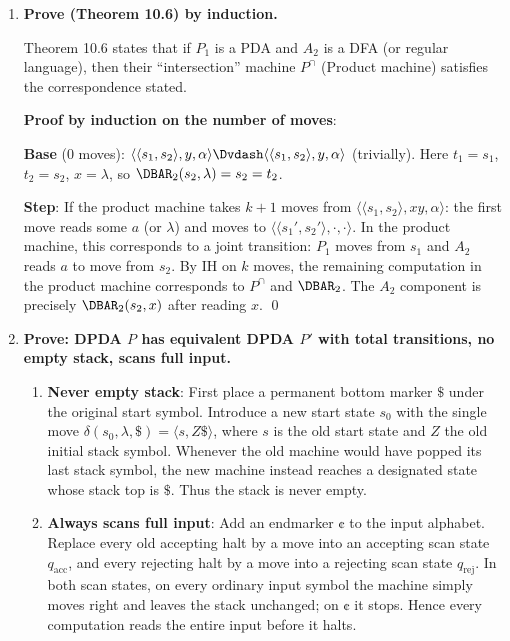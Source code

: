 \begin{enumerate}[{10.}1. ]
\textbf{Case 3}: $vx$ spans the $\pmb{b}$/$\pmb{c}$ boundary. Let $|vx|_{\pmb{b}}=j \geq 1$ and $|vx|_{\pmb{c}}=r \geq 0$. Choose $i-1 = p!/j$. The pumped string has $n = p!+p$ and $k = p!+p$ (the $\pmb{a}$-block is untouched), so $k = n$, violating $k\neq n$. Contradiction. \qed

\item \textbf{Prove (Theorem 10.6) by induction.}

Theorem 10.6 states that if $P_1$ is a PDA and $A_2$ is a DFA (or regular language), then their ``intersection'' machine $P^{\cap}$ (Product machine) satisfies the correspondence stated.

\textbf{Proof by induction on the number of moves}:

\textbf{Base} (0 moves): $\langle\langle s_1,s_2\rangle,y,\alpha\rangle\Dvdash\langle\langle s_1,s_2\rangle,y,\alpha\rangle$ (trivially). Here $t_1=s_1$, $t_2=s_2$, $x=\lambda$, so $\DBAR_2(s_2,\lambda)=s_2=t_2$. \checkmark

\textbf{Step}: If the product machine takes $k+1$ moves from $\langle\langle s_1,s_2\rangle,xy,\alpha\rangle$: the first move reads some $a$ (or $\lambda$) and moves to $\langle\langle s_1',s_2'\rangle,\cdot,\cdot\rangle$. In the product machine, this corresponds to a joint transition: $P_1$ moves from $s_1$ and $A_2$ reads $a$ to move from $s_2$. By IH on $k$ moves, the remaining computation in the product machine corresponds to $P^{\cap}$ and $\DBAR_2$. The $A_2$ component is precisely $\DBAR_2(s_2,x)$ after reading $x$. \qed

\item \textbf{Prove: DPDA $P$ has equivalent DPDA $P'$ with total transitions, no empty stack, scans full input.}

\begin{enumerate}
\item \textbf{Never empty stack}: First place a permanent bottom marker $\pmb{\$}$ under the original start symbol. Introduce a new start state $s_0$ with the single move $\delta(s_0,\lambda,\pmb{\$})=\langle s,Z\pmb{\$}\rangle$, where $s$ is the old start state and $Z$ the old initial stack symbol. Whenever the old machine would have popped its last stack symbol, the new machine instead reaches a designated state whose stack top is $\pmb{\$}$. Thus the stack is never empty.

\item \textbf{Always scans full input}: Add an endmarker $\pmb{\cent}$ to the input alphabet. Replace every old accepting halt by a move into an accepting scan state $q_{\mathrm{acc}}$, and every rejecting halt by a move into a rejecting scan state $q_{\mathrm{rej}}$. In both scan states, on every ordinary input symbol the machine simply moves right and leaves the stack unchanged; on $\pmb{\cent}$ it stops. Hence every computation reads the entire input before it halts.


\end{enumerate}
\end{enumerate}
